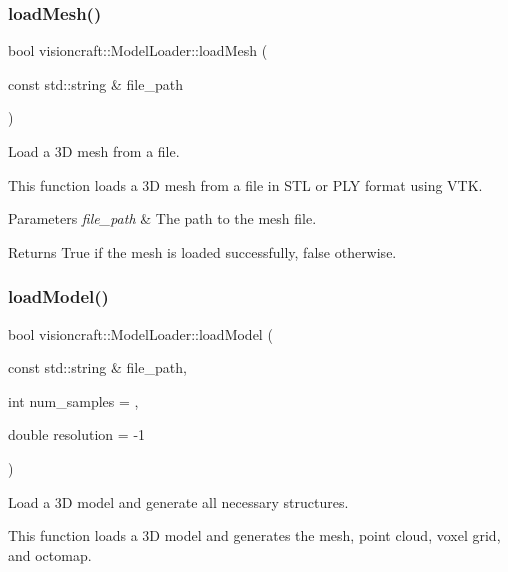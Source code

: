 \subsubsection{\texorpdfstring{load\+Mesh()}{loadMesh()}\hspace{0.1cm}{\footnotesize\ttfamily [2/2]}}
{\footnotesize\ttfamily bool visioncraft\+::\+Model\+Loader\+::load\+Mesh (\begin{DoxyParamCaption}\item[{const std\+::string \&}]{file\+\_\+path }\end{DoxyParamCaption})}



Load a 3D mesh from a file. 

This function loads a 3D mesh from a file in S\+TL or P\+LY format using V\+TK.


\begin{DoxyParams}{Parameters}
{\em file\+\_\+path} & The path to the mesh file. \\
\hline
\end{DoxyParams}
\begin{DoxyReturn}{Returns}
True if the mesh is loaded successfully, false otherwise. 
\end{DoxyReturn}
\mbox{\label{classvisioncraft_1_1ModelLoader_a6aa945177c6ad62ada1b3eb4b692e5ae}} 
\subsubsection{\texorpdfstring{load\+Model()}{loadModel()}}
{\footnotesize\ttfamily bool visioncraft\+::\+Model\+Loader\+::load\+Model (\begin{DoxyParamCaption}\item[{const std\+::string \&}]{file\+\_\+path,  }\item[{int}]{num\+\_\+samples = {},  }\item[{double}]{resolution = {\ttfamily -\/1} }\end{DoxyParamCaption})}



Load a 3D model and generate all necessary structures. 

This function loads a 3D model and generates the mesh, point cloud, voxel grid, and octomap.



